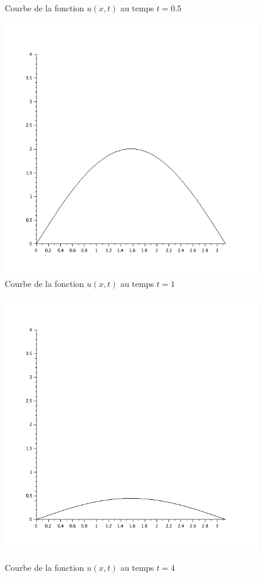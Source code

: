 \documentclass[a4paper,12pt]{report}
\begin{document}
\begin{figure}[h!]
\begin{minipage}[b]{0.48\linewidth}
	  \caption{Courbe  de la fonction $u(x,t)$ au temps $t=0.5$}
   \end{minipage}
   \begin{minipage}[b]{0.40\linewidth}
      \includegraphics[scale=0.3]{ex5_fig9.png}\\
	  \caption{Courbe  de la fonction $u(x,t)$ au temps $t=1$}
   \end{minipage}\hfill
   \begin{minipage}[b]{0.48\linewidth}   
      \includegraphics[scale=0.3]{ex5_fig10.png}\\
	  \caption{Courbe  de la fonction $u(x,t)$ au temps $t=4$}
   \end{minipage}
\end{figure}
\end{document}
